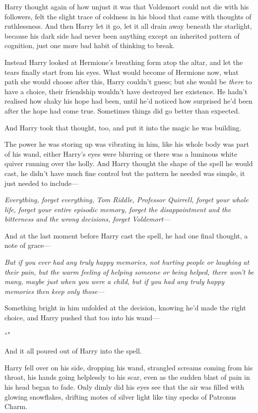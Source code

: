 Harry thought again of how unjust it was that Voldemort could not die with his followers, felt the slight trace of coldness in his blood that came with thoughts of ruthlessness. And then Harry let it go, let it all drain away beneath the starlight, because his dark side had never been anything except an inherited pattern of cognition, just one more bad habit of thinking to break.

Instead Harry looked at Hermione's breathing form atop the altar, and let the tears finally start from his eyes. What would become of Hermione now, what path she would choose after this, Harry couldn't guess; but she would be \emph{there} to have a choice, their friendship wouldn't have destroyed her existence. He hadn't realised how shaky his hope had been, until he'd noticed how surprised he'd been after the hope had come true. Sometimes things did go better than expected.

And Harry took that thought, too, and put it into the magic he was building.

The power he was storing up was vibrating in him, like his whole body was part of his wand, either Harry's eyes were blurring or there was a luminous white quiver running over the holly. And Harry thought the shape of the spell he would cast, he didn't have much fine control but the pattern he needed was simple, it just needed to include—

\emph{Everything, forget everything, Tom Riddle, Professor Quirrell, forget your whole life, forget your entire episodic memory, forget the disappointment and the bitterness and the wrong decisions, forget Voldemort—}

And at the last moment before Harry cast the spell, he had one final thought, a note of grace—

\emph{But if you ever had any truly happy memories, not hurting people or laughing at their pain, but the warm feeling of helping someone or being helped, there won't be many, maybe just when you were a child, but if you had any truly happy memories then keep only those—}

Something bright in him unfolded at the decision, knowing he'd made the right choice, and Harry pushed that too into his wand—

``\emph{}"

And it all poured out of Harry into the spell.

Harry fell over on his side, dropping his wand, strangled screams coming from his throat, his hands going helplessly to his scar, even as the sudden blast of pain in his head began to fade. Only dimly did his eyes see that the air was filled with glowing snowflakes, drifting motes of silver light like tiny specks of Patronus Charm.

